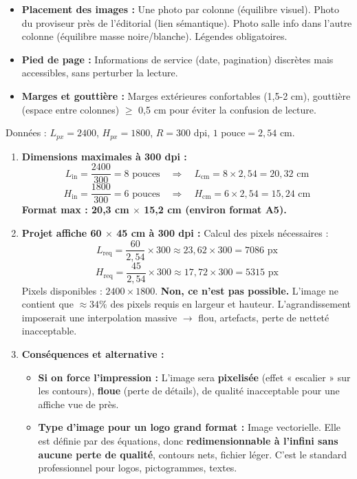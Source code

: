 \documentclass[11pt]{article}
\newcommand{\cle}[1]{{\popxbold\color{popdark}#1}}
\begin{document}
\begin{corrige}
\begin{enumerate}
\begin{itemize}
\item \textbf{Placement des images :} Une photo par colonne (équilibre visuel). Photo du proviseur près de l'éditorial (lien sémantique). Photo salle info dans l'autre colonne (équilibre masse noire/blanche). Légendes obligatoires.
\item \textbf{Pied de page :} Informations de service (date, pagination) discrètes mais accessibles, sans perturber la lecture.
\item \textbf{Marges et gouttière :} Marges extérieures confortables (1,5-2 cm), gouttière (espace entre colonnes) $\ge$ 0,5 cm pour éviter la confusion de lecture.
\end{itemize}
\end{enumerate}
\end{corrige}

\begin{corrige}
Données : $L_{px} = 2400$, $H_{px} = 1800$, $R = 300$ dpi, $1 \text{ pouce} = 2,54 \text{ cm}$.

\begin{enumerate}
\item \textbf{Dimensions maximales à 300 dpi :}
\[
L_{\text{in}} = \frac{2400}{300} = 8 \text{ pouces} \quad\Rightarrow\quad L_{\text{cm}} = 8 \times 2,54 = 20,32 \text{ cm}
\]
\[
H_{\text{in}} = \frac{1800}{300} = 6 \text{ pouces} \quad\Rightarrow\quad H_{\text{cm}} = 6 \times 2,54 = 15,24 \text{ cm}
\]
\textbf{Format max : 20,3 cm $\times$ 15,2 cm (environ format A5).}

\item \textbf{Projet affiche 60 $\times$ 45 cm à 300 dpi :}
Calcul des pixels nécessaires :
\[
L_{\text{req}} = \frac{60}{2,54} \times 300 \approx 23,62 \times 300 = 7086 \text{ px}
\]
\[
H_{\text{req}} = \frac{45}{2,54} \times 300 \approx 17,72 \times 300 = 5315 \text{ px}
\]
Pixels disponibles : $2400 \times 1800$.
\textbf{Non, ce n'est pas possible.} L'image ne contient que $\approx 34\%$ des pixels requis en largeur et hauteur. L'agrandissement imposerait une interpolation massive $\rightarrow$ flou, artefacts, perte de netteté inacceptable.

\item \textbf{Conséquences et alternative :}
\begin{itemize}
\item \textbf{Si on force l'impression :} L'image sera \textbf{pixelisée} (effet « escalier » sur les contours), \textbf{floue} (perte de détails), de qualité inacceptable pour une affiche vue de près.
\item \textbf{Type d'image pour un logo grand format :} \cle{Image vectorielle}. Elle est définie par des équations, donc \textbf{redimensionnable à l'infini sans aucune perte de qualité}, contours nets, fichier léger. C'est le standard professionnel pour logos, pictogrammes, textes.
\end{itemize}
\end{enumerate}
\end{corrige}
\end{document}
